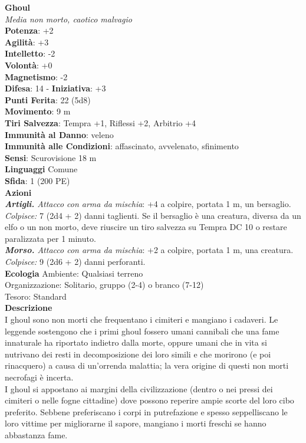 \begin{multicols}{2}
\medskip\textbf{Ghoul}\\
\emph{Media non morto, caotico malvagio}\\
\textbf{Potenza}: +2\\
\textbf{Agilità}: +3\\
\textbf{Intelletto}: -2\\
\textbf{Volontà}: +0\\
\textbf{Magnetismo}: -2\\
\textbf{Difesa}: 14 - \textbf{Iniziativa}: +3\\
\textbf{Punti Ferita}: 22 (5d8)\\
\textbf{Movimento}: 9 m\\
\textbf{Tiri Salvezza}: Tempra +1, Riflessi +2, Arbitrio +4\\
\textbf{Immunità al Danno}: veleno\\
\textbf{Immunità alle Condizioni}: affascinato, avvelenato, sfinimento\\
\textbf{Sensi}: Scurovisione 18 m\\
\textbf{Linguaggi} Comune\\
\textbf{Sfida}: 1 (200 PE)\smallskip\\
\smallskip\textbf{Azioni}\\
\emph{\textbf{Artigli.} Attacco con arma da mischia}: +4 a colpire, portata 1 m, un bersaglio.\\
\emph{Colpisce:} 7 (2d4 + 2) danni taglienti. Se il bersaglio è una creatura, diversa da un elfo o un non morto, deve riuscire un tiro salvezza su Tempra DC 10 o restare paralizzata per 1 minuto.\\
\emph{\textbf{Morso.} Attacco con arma da mischia}: +2 a colpire, portata 1 m, una creatura.\\
\emph{Colpisce:} 9 (2d6 + 2) danni perforanti.\\
\textbf{Ecologia}
Ambiente: Qualsiasi terreno\\
Organizzazione: Solitario, gruppo (2-4) o branco (7-12)\\
Tesoro: Standard\\
\textbf{Descrizione}\\
I ghoul sono non morti che frequentano i cimiteri e mangiano i cadaveri. Le leggende sostengono che i primi ghoul fossero umani cannibali che una fame innaturale ha riportato indietro dalla morte, oppure umani che in vita si nutrivano dei resti in decomposizione dei loro simili e che morirono (e poi rinacquero) a causa di un’orrenda malattia; la vera origine di questi non morti necrofagi è incerta.\\
I ghoul si appostano ai margini della civilizzazione (dentro o nei pressi dei cimiteri o nelle fogne cittadine) dove possono reperire ampie scorte del loro cibo preferito. Sebbene preferiscano i corpi in putrefazione e spesso seppelliscano le loro vittime per migliorarne il sapore, mangiano i morti freschi se hanno abbastanza fame.\\


\end{multicols}
